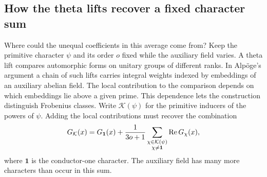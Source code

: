 \begin{construction}
\caption{The chain length and the two normalized allowances.
The heavy segments give the larger exponent. Lemma~\ref{lem:comparison}
also accounts for the density of the retained indices and the other
terms omitted in this scale calculation.}\label{fig:intro-length-balance}
\end{construction}

\subsection{How the theta lifts recover a fixed character sum}
\label{subsec:intro-family-arithmetic}

Where could the unequal coefficients in this average come from? Keep the primitive
character \(\psi\) and its order \(o\) fixed while the auxiliary field varies. A theta lift compares
automorphic forms on unitary groups of different ranks. In Alp\"oge's
argument a chain of such lifts carries integral weights indexed by
embeddings of an auxiliary abelian field. The local contribution to the
comparison depends on which embeddings lie above a given prime. This
dependence lets the construction distinguish Frobenius classes. Write \(\mathcal K(\psi)\) for the primitive inducers of the powers
of \(\psi\). Adding the local contributions must recover the combination
\[
 G_{\mathcal K}(x)=G_{\mathbf1}(x)
   +\frac{1}{3o+1}\sum_{\substack{\chi\in\mathcal K(\psi)\\ \chi\ne\mathbf1}}
                   \operatorname{Re} G_\chi(x),
\]
where \(\mathbf1\) is the conductor-one character. The auxiliary field has
many more characters than occur in this sum.

